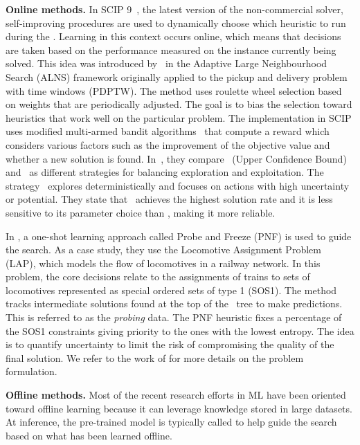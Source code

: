 \documentclass[3p, authoryear, times]{elsarticle}
\begin{document}
\textbf{Online methods.} In SCIP 9~\citep{bolusani_scip_2024}, the latest version of the non-commercial solver, self-improving procedures are used to dynamically choose which heuristic to run during the \bnb. Learning in this context occurs online, which means that decisions are taken based on the performance measured on the instance currently being solved. This idea was introduced by~\cite{ropke_adaptive_2006} in the Adaptive Large Neighbourhood Search (ALNS) framework originally applied to the pickup and delivery problem with time windows (PDPTW). The method uses roulette wheel selection based on weights that are periodically adjusted. The goal is to bias the selection toward heuristics that work well on the particular problem. The implementation in SCIP uses modified multi-armed bandit algorithms~\citep{hendel_adaptive_2019, hendel_adaptive_2022, chmiela_online_2023} that compute a reward which considers various factors such as the improvement of the objective value and whether a new solution is found. In~\cite{hendel_adaptive_2022}, they compare \ucb\ (Upper Confidence Bound) and \egreedy\ as different strategies for balancing exploration and exploitation. The strategy \ucb\ explores deterministically and focuses on actions with high uncertainty or potential. They state that \ucb\ achieves the highest solution rate and it is less sensitive to its parameter choice than \egreedy, making it more reliable.

In \cite{robinson_la_rocca_one-shot_2024}, a one-shot learning approach called Probe and Freeze (PNF) is used to guide the search. As a case study, they use the Locomotive Assignment Problem (LAP), which models the flow of locomotives in a railway network. In this problem, the core decisions relate to the assignments of trains to sets of locomotives represented as special ordered sets of type 1 (SOS1). The method tracks intermediate solutions found at the top of the \bnb\ tree to make predictions. This is referred to as the \textit{probing} data. The PNF heuristic fixes a percentage of the SOS1 constraints giving priority to the ones with the lowest entropy. The idea is to quantify uncertainty to limit the risk of compromising the quality of the final solution.  We refer to the work of \cite{ortiz-astorquiza_locomotive_2021} for more details on the problem formulation. 

\textbf{Offline methods.} Most of the recent research efforts in ML have been oriented toward offline learning because it can leverage knowledge stored in large datasets. At inference, the pre-trained model is typically called to help guide the search based on what has been learned offline. 
\end{document}
